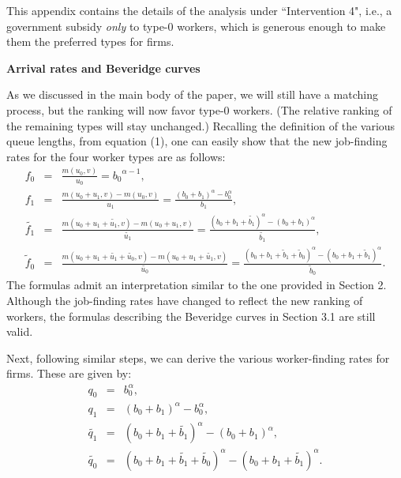 \documentclass[12pt]{article} %
\theoremstyle{definition}
\begin{document}
This appendix contains the details of the analysis under ``Intervention 4", i.e., a government subsidy \textit{only} to type-0 workers, which is generous enough to make them the preferred types for firms. 

\medskip 

\noindent \textbf{Arrival rates and Beveridge curves}

\medskip 

\noindent As we discussed in the main body of the paper, we will still have a \cite{petrongolo2001looking} matching process, but the ranking will now favor type-0 workers. (The relative ranking of the remaining types will stay unchanged.) Recalling the definition of the various {queue lengths}, from equation (1), 
one can easily show that the new job-finding rates for the four worker types are as follows: 
\begin{eqnarray*}
	f_0 &=& \frac{m(u_0,v)}{u_0} = {b_0}^{\alpha-1},\nonumber  \\
	{f_1} &=& \frac{m(u_0+{u_1},v)-m(u_0,v)}{{u_1}} = \frac{(b_0+{b}_1)^\alpha - b_0^\alpha}{{b}_1},\nonumber  \\
	\tilde{f_1} &=& \frac{m(u_0+u_1+\tilde{u_1},v)-m(u_0+{u_1},v)}{\tilde{u_1}} = \frac{(b_0+{b}_1+\tilde{b_1})^\alpha - (b_0+{b}_1)^\alpha}{\tilde{b_1}}, \nonumber \\
	\tilde{f}_0 &=& \frac{m(u_0+u_1+\tilde{u_1}+\tilde{u_0},v)-m(u_0+u_1+\tilde{u_1},v)}{\tilde{u_0}} = \frac{(b_0+b_1+\tilde{b}_1+\tilde{b}_0)^\alpha - ({b_0+b_1+\tilde{b}_1})^\alpha}{\tilde{b}_0}. \nonumber 
\end{eqnarray*}The formulas admit an interpretation similar to the one provided in Section 2. Although the job-finding rates have changed to reflect the new ranking of workers, the formulas describing the Beveridge curves in Section 3.1
are still valid.  

Next, following similar steps, we can derive the various worker-finding rates for firms. These are given by:  
\begin{eqnarray*}
	q_0 &=& b_0^\alpha, \nonumber  \\
	{q_1} &=&  (b_0+{b_1})^\alpha - b_0^\alpha, \nonumber \\
	\tilde{q_1} &=& (b_0+b_1+\tilde{b_1})^\alpha - (b_0+{b_1})^\alpha, \nonumber  \\
	\tilde{q_0} &=&  (b_0+b_1+\tilde{b_1}+\tilde{b_0})^\alpha - (b_0+b_1+\tilde{b_1})^\alpha. \nonumber 
\end{eqnarray*}
\end{document}
